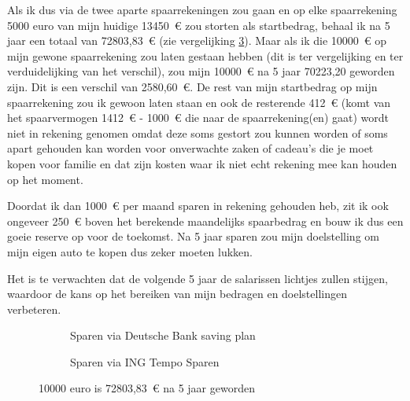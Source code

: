 Als ik dus via de twee aparte spaarrekeningen zou gaan en op elke spaarrekening 5000 euro van mijn huidige 13450~\euro{} zou storten als startbedrag, behaal ik na 5 jaar een totaal van 72803,83~\euro{} (zie vergelijking \ref{fig:tweespaarrekeningenoverzicht}). Maar als ik die 10000~\euro{} op mijn gewone spaarrekening zou laten gestaan hebben (dit is ter vergelijking en ter verduidelijking van het verschil), zou mijn 10000~\euro{} na 5 jaar 70223,20 geworden zijn. Dit is een verschil van 2580,60~\euro{}.
De rest van mijn startbedrag op mijn spaarrekening zou ik gewoon laten staan en ook de resterende 412~\euro{} (komt van het spaarvermogen 1412~\euro{} - 1000~\euro{} die naar de spaarrekening(en) gaat) wordt niet in rekening genomen omdat deze soms gestort zou kunnen worden of soms apart gehouden kan worden voor onverwachte zaken of cadeau's die je moet kopen voor familie en dat zijn kosten waar ik niet echt rekening mee kan houden op het moment.

Doordat ik dan 1000~\euro{} per maand sparen in rekening gehouden heb, zit ik ook ongeveer 250~\euro{} boven het berekende maandelijks spaarbedrag en bouw ik dus een goeie reserve op voor de toekomst. Na 5 jaar sparen zou mijn doelstelling om mijn eigen auto te kopen dus zeker moeten lukken.

Het is te verwachten dat de volgende 5 jaar de salarissen lichtjes zullen stijgen, waardoor de kans op het bereiken van mijn bedragen en doelstellingen verbeteren.

\begin{comment}

\begin{figure}[!htbp]
	\centering
	\texttt{[image: spaarvermogen/bedragsparendeutschebank.PNG]}
	\caption{sparen voor doelstellingen}
	\label{fig:bedragsparendeutschebank}
\end{figure}

\begin{figure}[!htbp]
	\centering
	\texttt{[image: spaarvermogen/bedragspareningbank.PNG]}
	\caption{sparen voor doelstellingen}
	\label{fig:bedragspareningbank}
\end{figure}

\end{comment}

\begin{figure}
    \centering
    \begin{subfigure}[b]{0.49\textwidth}        
        \caption{Sparen via Deutsche Bank saving plan}
        \label{fig:bedragsparendeutschebank}
    \end{subfigure}
    \begin{subfigure}[b]{0.49\textwidth}
        \caption{Sparen via ING Tempo Sparen}
        \label{fig:bedragspareningbank}
    \end{subfigure}
    \caption{10000 euro is 72803,83~\euro{} na 5 jaar geworden}\label{fig:tweespaarrekeningenoverzicht}
\end{figure}


